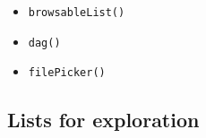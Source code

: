 \begin{itemize}
  \begin{itemize}
  \tightlist
  \item
    \texttt{b\allowbreak{}r\allowbreak{}o\allowbreak{}w\allowbreak{}s\allowbreak{}a\allowbreak{}b\allowbreak{}l\allowbreak{}e\allowbreak{}L\allowbreak{}i\allowbreak{}s\allowbreak{}t\allowbreak{}(\allowbreak{})}
  \item
    \texttt{d\allowbreak{}a\allowbreak{}g\allowbreak{}(\allowbreak{})}
  \item
    \texttt{f\allowbreak{}i\allowbreak{}l\allowbreak{}e\allowbreak{}P\allowbreak{}i\allowbreak{}c\allowbreak{}k\allowbreak{}e\allowbreak{}r\allowbreak{}(\allowbreak{})}
  \end{itemize}
\end{itemize}

\subsection{Lists for exploration}\label{record-019-lists-for-exploration}

